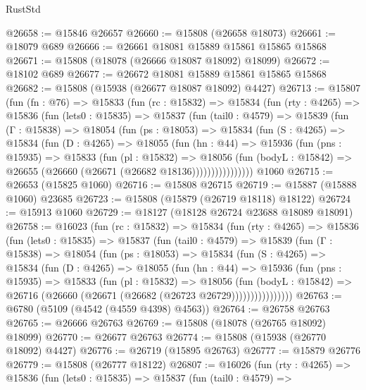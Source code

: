 \begin{lexlean}{RustStd}
\begin{coremodule}
@26658 := @15846 @26657
@26660 := @15808 (@26658 @18073)
@26661 := @18079 @689
@26666 := @26661 @18081 @15889 @15861 @15865 @15868
@26671 := @15808 (@18078 (@26666 @18087 @18092) @18099)
@26672 := @18102 @689
@26677 := @26672 @18081 @15889 @15861 @15865 @15868
@26682 := @15808 (@15938 (@26677 @18087 @18092) @4427)
@26713 := @15807
    (fun (fn : @76) =>
    @15833
      (fun (rc : @15832) =>
      @15834
        (fun (rty : @4265) =>
        @15836
          (fun (lets0 : @15835) =>
          @15837
            (fun (tail0 : @4579) =>
            @15839
              (fun (Γ : @15838) =>
              @18054
                (fun (ps : @18053) =>
                @15834
                  (fun (S : @4265) =>
                  @15834
                    (fun (D : @4265) =>
                    @18055
                      (fun (hn : @44) =>
                      @15936
                        (fun (pns : @15935) =>
                        @15833
                          (fun (pl : @15832) =>
                          @18056
                            (fun (bodyL : @15842) =>
                            @26655 (@26660 (@26671 (@26682 @18136))))))))))))))))
    @1060
@26715 := @26653 (@15825 @1060)
@26716 := @15808 @26715
@26719 := @15887 (@15888 @1060) @23685
@26723 := @15808 (@15879 (@26719 @18118) @18122)
@26724 := @15913 @1060
@26729 := @18127 (@18128 @26724 @23688 @18089 @18091)
@26758 := @16023
    (fun (rc : @15832) =>
    @15834
      (fun (rty : @4265) =>
      @15836
        (fun (lets0 : @15835) =>
        @15837
          (fun (tail0 : @4579) =>
          @15839
            (fun (Γ : @15838) =>
            @18054
              (fun (ps : @18053) =>
              @15834
                (fun (S : @4265) =>
                @15834
                  (fun (D : @4265) =>
                  @18055
                    (fun (hn : @44) =>
                    @15936
                      (fun (pns : @15935) =>
                      @15833
                        (fun (pl : @15832) =>
                        @18056
                          (fun (bodyL : @15842) =>
                          @26716 (@26660 (@26671 (@26682 (@26723 @26729))))))))))))))))
@26763 := @6780 (@5109 (@4542 (@4559 @4398) @4563))
@26764 := @26758 @26763
@26765 := @26666 @26763
@26769 := @15808 (@18078 (@26765 @18092) @18099)
@26770 := @26677 @26763
@26774 := @15808 (@15938 (@26770 @18092) @4427)
@26776 := @26719 (@15895 @26763)
@26777 := @15879 @26776
@26779 := @15808 (@26777 @18122)
@26807 := @16026
    (fun (rty : @4265) =>
    @15836
      (fun (lets0 : @15835) =>
      @15837
        (fun (tail0 : @4579) =>

\end{coremodule}
\end{lexlean}
